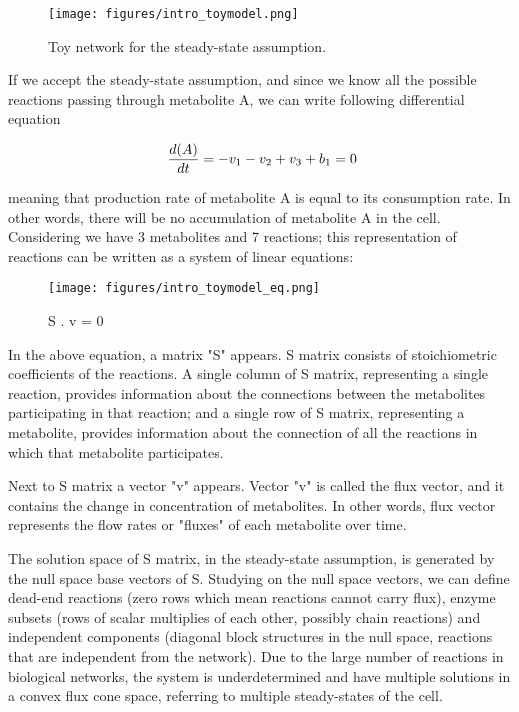 \begin{figure}[h]
\begin{center}
\texttt{[image: figures/intro\_toymodel.png]}
\end{center}
\caption[Toy network for the steady-state assumption]{Toy network for the steady-state assumption.}
\label{fig:ToyNetwork}
\end{figure}

If we accept the steady-state assumption, and since we know all the possible reactions passing through metabolite A, we can write following differential equation

\begin{equation}
 \ \frac{d(A)}{dt} = - v_1 - v_2 + v_3 + b_1 = 0 \\
\end{equation}


meaning that production rate of metabolite A is equal to its consumption rate. In other words, there will be no accumulation of metabolite A in the cell. Considering we have 3 metabolites and 7 reactions; this representation of reactions can be written as a system of linear equations:
\begin{figure}[h]
\texttt{[image: figures/intro\_toymodel\_eq.png]}
\begin{center}S . v = 0 \end{center}
\end{figure}

In the above equation, a matrix "S" appears. S matrix consists of stoichiometric coefficients of the reactions. A single column of S matrix, representing a single reaction, provides information about the connections between the metabolites participating in that reaction; and a single row of S matrix, representing a metabolite, provides information about the connection of all the reactions in which that metabolite participates.

Next to S matrix a vector "v" appears. Vector "v" is called the flux vector, and it contains the change in concentration of metabolites. In other words, flux vector represents the flow rates or "fluxes" of each metabolite over time.

The solution space of S matrix, in the steady-state assumption, is generated by the null space base vectors of S. Studying on the null space vectors, we can define dead-end reactions (zero rows which mean reactions cannot carry flux), enzyme subsets (rows of scalar multiplies of each other, possibly chain reactions) and independent components (diagonal block structures in the null space, reactions that are independent from the network). Due to the large number of reactions in biological networks, the system is underdetermined and have multiple solutions in a convex flux cone space, referring to multiple steady-states of the cell.

